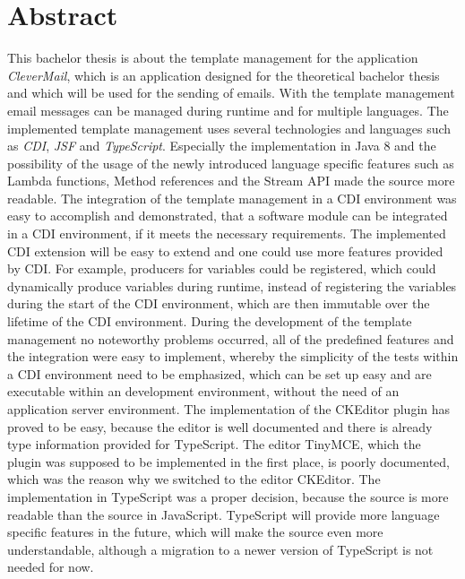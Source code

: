 \chapter{Abstract}
This bachelor thesis is about the template management for the application \emph{CleverMail}, which is an application designed for the theoretical bachelor thesis and which will be used for the sending of emails. With the template management email messages can be managed during runtime and for multiple languages.
\newline
\newline
The implemented template management uses several technologies and languages such as \emph{CDI},  \emph{JSF} and \emph{TypeScript}. Especially the implementation in Java 8 and the possibility of the usage of the newly introduced language specific features such as Lambda functions, Method references and the Stream API made the source more readable. The integration of the template management in a CDI environment was easy to accomplish and demonstrated, that a software module can be integrated in a CDI environment, if it meets the necessary requirements. The implemented CDI extension will be easy to extend and one could use more features provided by CDI. For example, producers for variables could be registered, which could dynamically produce variables during runtime, instead of registering the variables during the start of the CDI environment, which are then immutable over the lifetime of the CDI environment.
\newline
\newline
During the development of the template management no noteworthy problems occurred, all of the predefined features and the integration were easy to implement, whereby the simplicity of the tests within a CDI environment need to be emphasized, which can be set up easy and are executable within an development environment, without the need of an application server environment.
\newline
\newline
The implementation of the CKEditor plugin has proved to be easy, because the editor is well  documented and there is already type information provided for TypeScript. The editor TinyMCE, which the plugin was supposed to be implemented in the first place, is poorly documented, which was the reason why we switched to the editor CKEditor. The implementation in TypeScript was a proper decision, because the source is more readable than the source in JavaScript. TypeScript will provide more language specific features in the future, which will make the source even more understandable, although a migration to a newer version of TypeScript is not needed for now.
